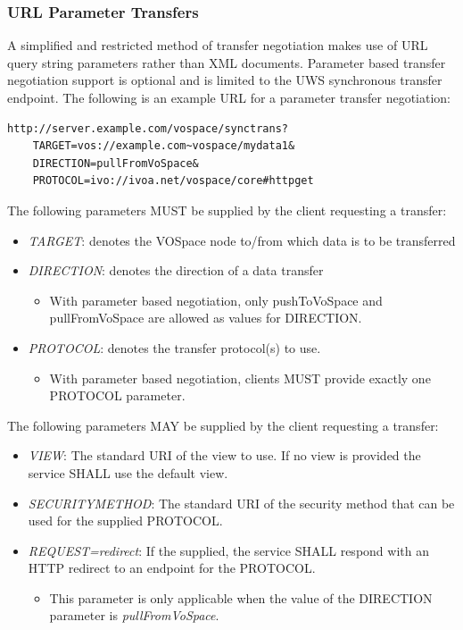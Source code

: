 \documentclass[11pt,a4paper]{ivoa}
\begin{document}
\subsubsection{URL Parameter Transfers}
\label{subsubsec:url parameter transfers}
A simplified and restricted method of transfer negotiation makes use of URL query string parameters rather than XML documents.  Parameter based transfer negotiation support is optional and is limited to the UWS synchronous transfer endpoint.  The following is an example URL for a parameter transfer negotiation:

\begin{verbatim}
http://server.example.com/vospace/synctrans?
    TARGET=vos://example.com~vospace/mydata1&
    DIRECTION=pullFromVoSpace&
    PROTOCOL=ivo://ivoa.net/vospace/core#httpget
\end{verbatim}

The following parameters MUST be supplied by the client requesting a transfer:

\begin{itemize}
    \item \emph{TARGET}: denotes the VOSpace node to/from which data is to be transferred
    \item \emph{DIRECTION}: denotes the direction of a data transfer
        \begin{itemize}
            \item With parameter based negotiation, only pushToVoSpace and pullFromVoSpace are allowed as values for DIRECTION.
        \end{itemize}
    \item \emph{PROTOCOL}: denotes the transfer protocol(s) to use. 
        \begin{itemize}
            \item With parameter based negotiation, clients MUST provide exactly one PROTOCOL parameter.
        \end{itemize}
\end{itemize}

The following parameters MAY be supplied by the client requesting a transfer:

\begin{itemize}
    \item \emph{VIEW}: The standard URI of the view to use.  If no view is provided the service SHALL use the default view.
    \item \emph{SECURITYMETHOD}: The standard URI of the security method that can be used for the supplied PROTOCOL.
    \item \emph{REQUEST=redirect}: If the supplied, the service SHALL respond with an HTTP redirect to an endpoint for the PROTOCOL.
    \begin{itemize}
        \item This parameter is only applicable when the value of the DIRECTION parameter is \emph{pullFromVoSpace}.
    \end{itemize}
\end{itemize}
\end{document}
